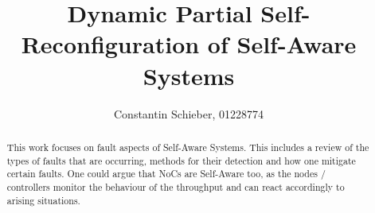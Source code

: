 \documentclass[10pt, journal]{IEEEtran}
\title{Dynamic Partial Self-Reconfiguration of Self-Aware Systems}
\author{Constantin Schieber, 01228774}
\begin{document}
\maketitle

\begin{abstract}
    This work focuses on fault aspects of Self-Aware Systems.
    This includes a review of the types of faults that are occurring, methods for their detection and how one mitigate certain faults. 
    One could argue that \glspl{NoC} are Self-Aware too, as the nodes / controllers monitor the behaviour of the throughput and can react accordingly to arising situations.
\end{abstract}










%
%
%
\printglossaries 



\end{document}
